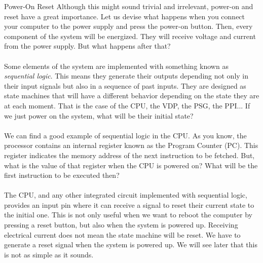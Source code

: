 \begin{theory}{Power-On Reset}
  Although this might sound trivial and irrelevant, power-on and reset have a great importance. Let us devise what happens when you connect your computer to the power supply and press the power-on button. Then, every component of the system will be energized. They will receive voltage and current from the power supply. But what happens after that?\\\\

  Some elements of the system are implemented with something known as {\it sequential logic}. This means they generate their outputs depending not only in their input signals but also in a sequence of past inputs. They are designed as state machines that will have a different behavior depending on the state they are at each moment. That is the case of the CPU, the VDP, the PSG, the PPI... If we just power on the system, what will be their initial state?\\\\

  We can find a good example of sequential logic in the CPU. As you know, the processor contains an internal register known as the Program Counter (PC). This register indicates the memory address of the next instruction to be fetched. But, what is the value of that register when the CPU is powered on? What will be the first instruction to be executed then?\\\\

  The CPU, and any other integrated circuit implemented with sequential logic, provides an input pin where it can receive a signal to reset their current state to the initial one. This is not only useful when we want to reboot the computer by pressing a reset button, but also when the system is powered up. Receiving electrical current does not mean the state machine will be reset. We have to generate a reset signal when the system is powered up. We will see later that this is not as simple as it sounds.
\end{theory}


